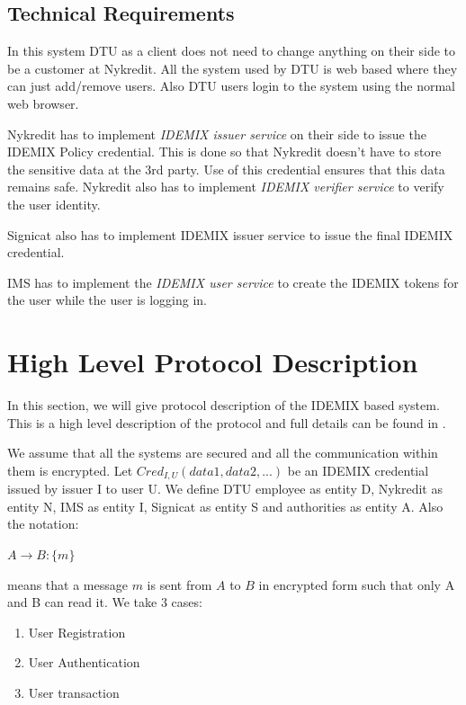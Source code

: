 \subsection{Technical Requirements}
In this system DTU as a client does not need to change anything on their side to be a customer at Nykredit. All the system used by DTU is web based where they can just add/remove users. Also DTU users login to the system using the normal web browser.

Nykredit has to implement \textit{IDEMIX issuer service}\cite{camenisch2002design} on their side to issue the IDEMIX Policy credential. This is done so that Nykredit doesn’t have to store the sensitive data at the 3rd party. Use of this credential ensures that this data remains safe. Nykredit also has to implement \textit{IDEMIX verifier service} to verify the user identity.

Signicat also has to implement IDEMIX issuer service to issue the final IDEMIX credential.

IMS has to implement the \textit{IDEMIX user service} to create the IDEMIX tokens for the user while the user is logging in.
\section{High Level Protocol Description}
In this section, we will give protocol description of the IDEMIX based system. This is a high level description of the protocol and full details can be found in \cite{camenisch2001efficient}.

We assume that all the systems are secured and all the communication within them is encrypted. Let $Cred_{I,U}(data1,data2,...)$ be an IDEMIX credential issued by issuer I to user U. We define DTU employee as entity D, Nykredit as entity N, IMS as entity I, Signicat as entity S and authorities as entity A. Also the notation:
\begin{center}
$A \rightarrow B : \{m\}$
\end{center}
means that a message $m$ is sent from $A$ to $B$ in encrypted form such that only A and B can read it.
We take 3 cases:

\begin{enumerate}
\item User Registration
\item User Authentication
\item User transaction
\end{enumerate}
	

